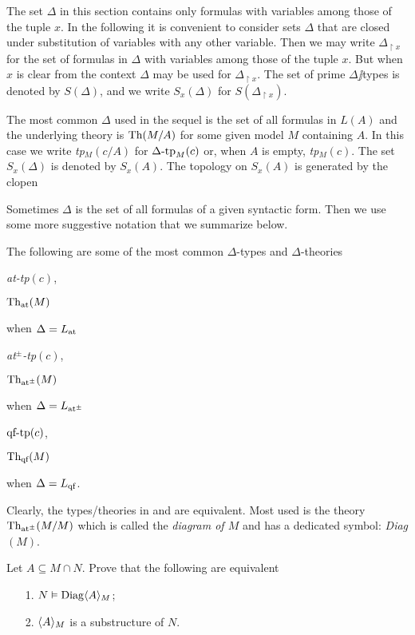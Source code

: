 \documentclass[creche.tex]{subfiles}
\begin{document}
The set $\Delta$ in this section contains only formulas with variables among those of the tuple $x$. In the following it is convenient to consider sets $\Delta$ that are closed under substitution of variables with any other variable. Then we may write \emph{$\Delta_{\restriction x}$} for the set of formulas in $\Delta$ with variables among those of the tuple $x$. But when $x$ is clear from the context $\Delta$ may be used for $\Delta_{\restriction x}$. The set of prime $\Delta\jj$types is denoted by \emph{$S(\Delta)$}, and we write \emph{$S_x(\Delta)$\/} for $S(\Delta_{\restriction x})$.

The most common $\Delta$ used in the sequel is the set of all formulas in $L(A)$ and the underlying theory is $\textrm{Th}(M/A)$ for some given model $M$ containing $A$. In this case we write \emph{tp$_M(c/A)$} for $\Delta\mbox{-}\textrm{tp}_M(c)$ or, when $A$ is empty, \emph{tp$_M(c)$}. The set $S_x(\Delta)$ is denoted by $S_x(A)$. The topology on  $S_x(A)$ is generated by the clopen


Sometimes $\Delta$ is the set of all formulas of a given syntactic form. Then we use some more suggestive notation that we summarize below.

\begin{notation}\label{note_tipi_diagramma}
The following are some of the most common $\Delta$-types and $\Delta$-theories
\def\ceq#1#2{\parbox[b]{15ex}{#1}\parbox[b]{14ex}{\hfill #2}}


\ceq{\hfill\emph{\textrm{at-tp}$(c)$},}{\emph{$\textrm{Th}_{\textrm{\scriptsize at}}(M)$\/}}\qquad when $\Delta=L_{\tiny\rm at}\hskip-.3ex$

\ceq{\hfill\emph{\textrm{at$^\pm$-tp}$(c)$},}{\emph{$\textrm{Th}_{\textrm{\scriptsize at}^\pm}(M)$\/}}\qquad when $\Delta=L_{{\tiny\rm at^\pm}}\hskip-.3ex$

\ceq{\hfill\emph{$\textrm{qf\mbox{-}tp}(c)$},}{\emph{$\textrm{Th}_{\textrm{\scriptsize qf}}(M)$\/}}\qquad when $\Delta=L_{\rm qf}$.

Clearly, the types/theories in  and  are equivalent. Most used is the theory $\textrm{Th}_{\textrm{\scriptsize at}^\pm}(M/M)$ which is called the \emph{diagram of $M$\/} and has a dedicated symbol: \emph{Diag$(M)$}.\QED
\end{notation}

\begin{remark}\label{rem_diagram}
Let $A\subseteq M\cap N$. Prove that the following are equivalent
\begin{itemize}
\item[1.] $N\vDash{\rm Diag}\langle A\rangle_M$;
\item[2.] $\langle A\rangle_M$ is a substructure of $N$.\QED
\end{itemize}
\end{remark}
\end{document}
